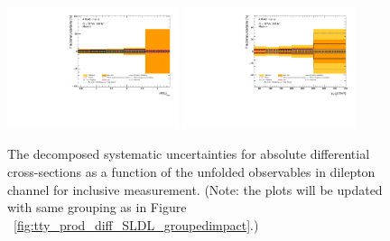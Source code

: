 \begin{figure}[ht]
  \includegraphics[width=0.45\textwidth]{figures/diff_xsec/groupedimpact-absolute-xsec/tty_total_DL/Uncertainty_tty2l_drlj_all_syst.pdf}%
  \includegraphics[width=0.45\textwidth]{figures/diff_xsec/groupedimpact-absolute-xsec/tty_total_DL/Uncertainty_tty2l_ptj1_all_syst.pdf}\\%
\caption{The decomposed systematic uncertainties for absolute differential cross-sections as a function of the unfolded observables in dilepton channel for inclusive \tty measurement.
 (Note: the plots will be updated with same grouping as in Figure ~\ref{fig:tty_prod_diff_SLDL_groupedimpact}.)}
\label{fig:tty_total_diff_DL1_groupedimpact}
\end{figure}
\FloatBarrier

